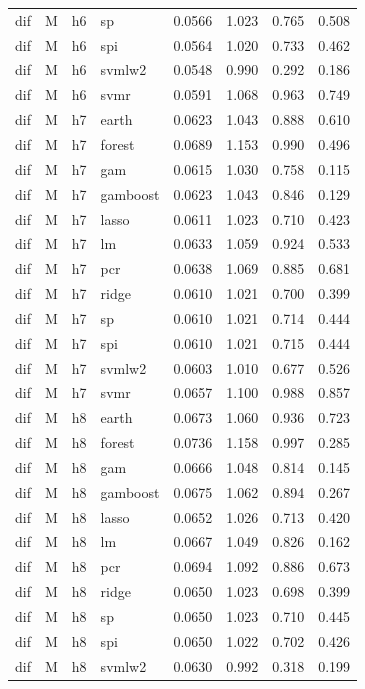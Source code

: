\begin{ThreePartTable}
\begin{longtable}[t]{llclcccc}
dif & M & h6 & sp & 0.0566 & 1.023 & 0.765 & 0.508\\
dif & M & h6 & spi & 0.0564 & 1.020 & 0.733 & 0.462\\
dif & M & h6 & svmlw2 & 0.0548 & 0.990 & 0.292 & 0.186\\
dif & M & h6 & svmr & 0.0591 & 1.068 & 0.963 & 0.749\\
\addlinespace
dif & M & h7 & earth & 0.0623 & 1.043 & 0.888 & 0.610\\
dif & M & h7 & forest & 0.0689 & 1.153 & 0.990 & 0.496\\
dif & M & h7 & gam & 0.0615 & 1.030 & 0.758 & 0.115\\
dif & M & h7 & gamboost & 0.0623 & 1.043 & 0.846 & 0.129\\
dif & M & h7 & lasso & 0.0611 & 1.023 & 0.710 & 0.423\\
dif & M & h7 & lm & 0.0633 & 1.059 & 0.924 & 0.533\\
dif & M & h7 & pcr & 0.0638 & 1.069 & 0.885 & 0.681\\
dif & M & h7 & ridge & 0.0610 & 1.021 & 0.700 & 0.399\\
dif & M & h7 & sp & 0.0610 & 1.021 & 0.714 & 0.444\\
dif & M & h7 & spi & 0.0610 & 1.021 & 0.715 & 0.444\\
dif & M & h7 & svmlw2 & 0.0603 & 1.010 & 0.677 & 0.526\\
dif & M & h7 & svmr & 0.0657 & 1.100 & 0.988 & 0.857\\
\addlinespace
dif & M & h8 & earth & 0.0673 & 1.060 & 0.936 & 0.723\\
dif & M & h8 & forest & 0.0736 & 1.158 & 0.997 & 0.285\\
dif & M & h8 & gam & 0.0666 & 1.048 & 0.814 & 0.145\\
dif & M & h8 & gamboost & 0.0675 & 1.062 & 0.894 & 0.267\\
dif & M & h8 & lasso & 0.0652 & 1.026 & 0.713 & 0.420\\
dif & M & h8 & lm & 0.0667 & 1.049 & 0.826 & 0.162\\
dif & M & h8 & pcr & 0.0694 & 1.092 & 0.886 & 0.673\\
dif & M & h8 & ridge & 0.0650 & 1.023 & 0.698 & 0.399\\
dif & M & h8 & sp & 0.0650 & 1.023 & 0.710 & 0.445\\
dif & M & h8 & spi & 0.0650 & 1.022 & 0.702 & 0.426\\
dif & M & h8 & svmlw2 & 0.0630 & 0.992 & 0.318 & 0.199\\

\end{longtable}
\end{ThreePartTable}
